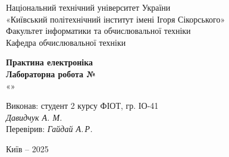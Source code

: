 \documentclass[12pt,a4paper]{article}
\begin{document}
    \begin{titlepage}

        \thispagestyle{empty}
        \begin{center}
        \large
        Національний технічний університет України\\
        «Київський політехнічний інститут імені Ігоря Сікорського»\\[1em]
        Факультет інформатики та обчислювальної техніки\\
        Кафедра обчислювальної техніки
        \end{center}

        \vfill

        \begin{center}
        \textbf{\LARGE Практина електроніка}\\[2em]
        \textbf{\Large Лабораторна робота №}\\
        «» 
        \end{center}

        \vfill

        \begin{flushright}
        Виконав: студент 2 курсу ФІОТ, гр. ІО-41\\
        \textit{Давидчук А. М.}\\
        Перевірив: \textit{Гайдай А.\,Р.}
        \end{flushright}

        \vfill

        \begin{center}
        Київ -- 2025
        \end{center}

    \end{titlepage}

\end{document}
